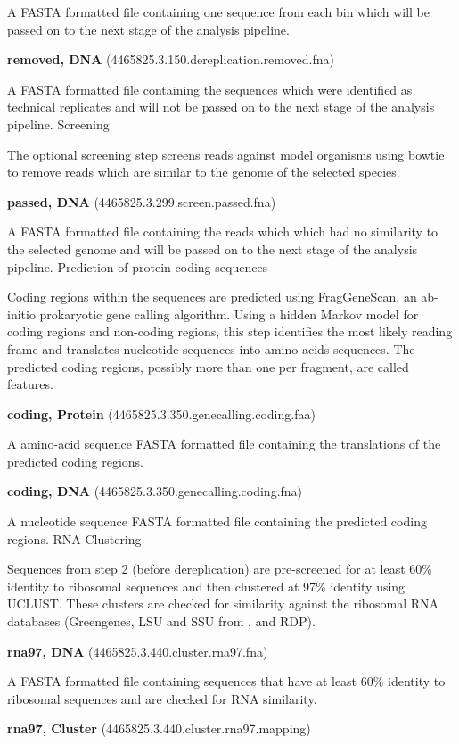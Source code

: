 \documentclass[12pt,fullpage]{report}
\begin{document}
\begin{appendices}
\begin{mdframed}
A FASTA formatted file containing one sequence from each bin which will be passed on to the next stage of the analysis pipeline.

\textbf{removed, DNA} (4465825.3.150.dereplication.removed.fna)

A FASTA formatted file containing the sequences which were identified as technical replicates and will not be passed on to the next stage of the analysis pipeline.
Screening

The optional screening step screens reads against model organisms using bowtie to remove reads which are similar to the genome of the selected species.

\textbf{passed, DNA} (4465825.3.299.screen.passed.fna)

A FASTA formatted file containing the reads which which had no similarity to the selected genome and will be passed on to the next stage of the analysis pipeline.
Prediction of protein coding sequences

Coding regions within the sequences are predicted using FragGeneScan, an ab-initio prokaryotic gene calling algorithm. Using a hidden Markov model for coding regions and non-coding regions, this step identifies the most likely reading frame and translates nucleotide sequences into amino acids sequences. The predicted coding regions, possibly more than one per fragment, are called features.

\textbf{coding, Protein} (4465825.3.350.genecalling.coding.faa)

A amino-acid sequence FASTA formatted file containing the translations of the predicted coding regions.

\textbf{coding, DNA} (4465825.3.350.genecalling.coding.fna)

A nucleotide sequence FASTA formatted file containing the predicted coding regions.
RNA Clustering

Sequences from step 2 (before dereplication) are pre-screened for at least 60\% identity to ribosomal sequences and then clustered at 97\% identity using UCLUST. These clusters are checked for similarity against the ribosomal RNA databases (Greengenes\cite{GREENGENES}, LSU and SSU from \cite{SILVA}, and RDP\cite{RDP}).

\textbf{rna97, DNA} (4465825.3.440.cluster.rna97.fna)

A FASTA formatted file containing sequences that have at least 60\% identity to ribosomal sequences and are checked for RNA similarity.

\textbf{rna97, Cluster} (4465825.3.440.cluster.rna97.mapping)


\end{mdframed}
\end{appendices}
\end{document}
